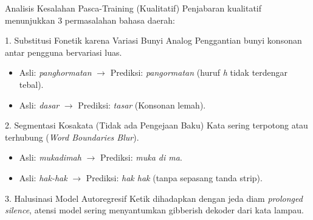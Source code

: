 \begin{frame}{Analisis Kesalahan Pasca-Training (Kualitatif)}
    Penjabaran kualitatif menunjukkan 3 permasalahan bahasa daerah:
    
    \begin{block}{1. Substitusi Fonetik karena Variasi Bunyi Analog}
        Penggantian bunyi konsonan antar pengguna bervariasi luas.
        \begin{itemize}
            \item Asli: \textit{panghormatan} $\rightarrow$ Prediksi: \textit{pangormatan} (huruf \textit{h} tidak terdengar tebal).
            \item Asli: \textit{dasar} $\rightarrow$ Prediksi: \textit{tasar} (Konsonan lemah).
        \end{itemize}
    \end{block}

    \begin{alertblock}{2. Segmentasi Kosakata (Tidak ada Pengejaan Baku)}
        Kata sering terpotong atau terhubung (\textit{Word Boundaries Blur}).
        \begin{itemize}
            \item Asli: \textit{mukadimah} $\rightarrow$ Prediksi: \textit{muka di ma}.
            \item Asli: \textit{hak-hak} $\rightarrow$ Prediksi: \textit{hak hak} (tanpa sepasang tanda strip).
        \end{itemize}
    \end{alertblock}

    \begin{exampleblock}{3. Halusinasi Model Autoregresif}
        Ketik dihadapkan dengan jeda diam \textit{prolonged silence}, atensi model sering menyantumkan gibberish dekoder dari kata lampau.
    \end{exampleblock}
\end{frame}
